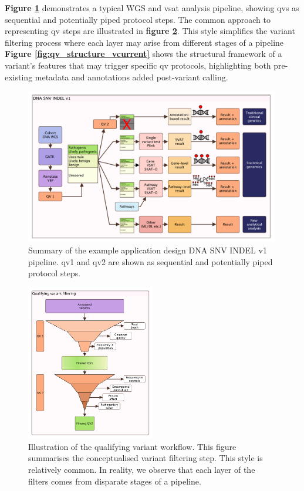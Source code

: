 \textbf{Figure \ref{fig:pipeline_figure}} 
demonstrates a typical WGS and \ac{vsat} analysis pipeline, showing \ac{qv}s as sequential and potentially piped protocol steps.
The common approach to representing \ac{qv} steps are illustrated in 
\textbf{figure \ref{fig:qv_filter_pyramid_vcurrent}}.
This style simplifies the variant filtering process where each layer may arise from different stages of a pipeline
 \textbf{Figure 
\ref{fig:qv_structure_vcurrent}}
shows the structural framework of a variant's features that may trigger specific \ac{qv} protocols, highlighting both pre-existing metadata and annotations added post-variant calling.

    
\begin{figure}[h]
    \centering
   \includegraphics[width=0.99\textwidth]{./images/qv_pipeline_vcurrent.pdf}
    \caption{Summary of the example application design DNA SNV INDEL v1 pipeline. \ac{qv}1 and \ac{qv}2 are shown as sequential and potentially piped protocol steps.}
    \label{fig:pipeline_figure}
\end{figure}

\begin{figure}[h]
\centering
     \includegraphics[width=0.5\textwidth]{./images/qv_filter_pyramid_vcurrent.pdf}
\caption{Illustration of the qualifying variant workflow. This figure summarises the conceptualised variant filtering step. This style is relatively common. In reality, we observe that each layer of the filters comes from disparate stages of a pipeline.}
    \label{fig:qv_filter_pyramid_vcurrent}
\end{figure}

